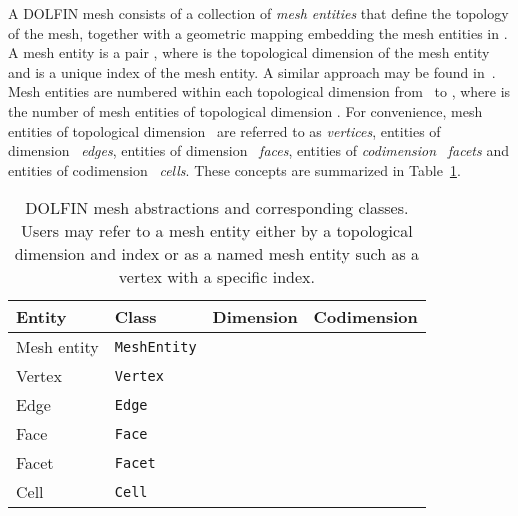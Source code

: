 \documentclass[acmtoms]{acmtrans2m}
\newcommand{\emp}[1]{\texttt{#1}}
\newcommand{\dolfin}{DOLFIN}
\begin{document}
A \dolfin{} mesh consists of a collection of \emph{mesh entities} that
define the topology of the mesh, together with a geometric mapping
embedding the mesh entities in . A mesh entity is a pair
, where  is the topological dimension of the mesh entity and 
is a unique index of the mesh entity. A similar approach may be found
in~. Mesh entities are numbered within each
topological dimension from~ to , where  is the number
of mesh entities of topological dimension . For convenience, mesh
entities of topological dimension~ are referred to as
\emph{vertices}, entities of dimension~ \emph{edges}, entities of
dimension~ \emph{faces}, entities of \emph{codimension}~
\emph{facets} and entities of codimension~ \emph{cells}. These
concepts are summarized in Table~\ref{tab:entities}.
\begin{table}
  \begin{center}
    \begin{tabular}{|l|l|c|c|}
      \hline
      Entity & Class & Dimension & Codimension \\
      \hline
      \hline
      Mesh entity & \emp{MeshEntity} &        &  \\
      \hline
      Vertex      & \emp{Vertex}     &        &      \\
      Edge        & \emp{Edge}       &        &  \\
      Face        & \emp{Face}       &        &  \\
      \hline
      Facet       & \emp{Facet}      &    &      \\
      Cell        & \emp{Cell}       &        &      \\
      \hline
    \end{tabular}
    \caption{\dolfin{} mesh abstractions and corresponding classes.
      Users may refer to a mesh entity either by a topological
      dimension and index or as a named mesh entity such as a vertex
      with a specific index.}
    \label{tab:entities}
  \end{center}
\end{table}
\end{document}
